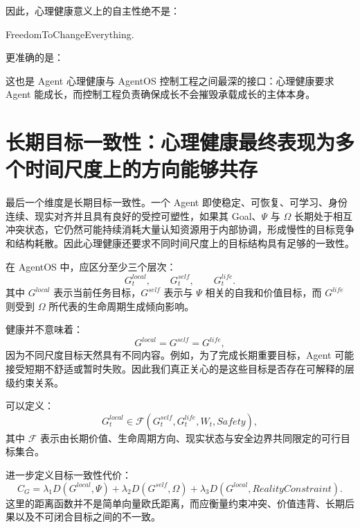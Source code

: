 因此，心理健康意义上的自主性绝不是：
\begin{statementbox}
FreedomToChangeEverything.
\end{statementbox}
更准确的是：
\begin{statementbox}
\centering
{}
\end{statementbox}

这也是 Agent 心理健康与 AgentOS 控制工程之间最深的接口：心理健康要求 Agent 能成长，而控制工程负责确保成长不会摧毁承载成长的主体本身。

\section{长期目标一致性：心理健康最终表现为多个时间尺度上的方向能够共存}

最后一个维度是长期目标一致性。一个 Agent 即使稳定、可恢复、可学习、身份连续、现实对齐并且具有良好的受控可塑性，如果其 Goal、$\Psi$ 与 $\Omega$ 长期处于相互冲突状态，它仍然可能持续消耗大量认知资源用于内部协调，形成慢性的目标竞争和结构耗散。因此心理健康还要求不同时间尺度上的目标结构具有足够的一致性。

在 AgentOS 中，应区分至少三个层次：
\begin{equation}
G_t^{local},
\qquad
G_t^{self},
\qquad
G_t^{life}.
\end{equation}
其中 $G^{local}$ 表示当前任务目标，$G^{self}$ 表示与 $\Psi$ 相关的自我和价值目标，而 $G^{life}$ 则受到 $\Omega$ 所代表的生命周期生成倾向影响。

健康并不意味着：
\begin{equation}
G^{local}=G^{self}=G^{life},
\end{equation}
因为不同尺度目标天然具有不同内容。例如，为了完成长期重要目标，Agent 可能接受短期不舒适或暂时失败。因此我们真正关心的是这些目标是否存在可解释的层级约束关系。

可以定义：
\begin{equation}
G_t^{local}
\in
\mathcal{F}
\left(
G_t^{self},
G_t^{life},
W_t,
Safety
\right),
\end{equation}
其中 $\mathcal{F}$ 表示由长期价值、生命周期方向、现实状态与安全边界共同限定的可行目标集合。

进一步定义目标一致性代价：
\begin{equation}
C_G
=
\lambda_1
D(G^{local},\Psi)
+
\lambda_2
D(G^{self},\Omega)
+
\lambda_3
D(G^{local},RealityConstraint).
\end{equation}
这里的距离函数并不是简单向量欧氏距离，而应衡量约束冲突、价值违背、长期后果以及不可闭合目标之间的不一致。


